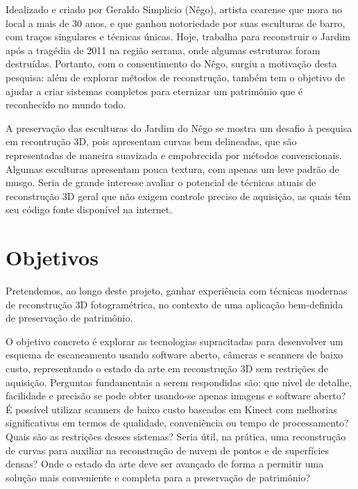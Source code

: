 Idealizado e criado por Geraldo Simplicio (Nêgo), artista cearense que mora no
local a mais de 30 anos, e que ganhou notoriedade por suas esculturas de barro,
com traços singulares e técnicas únicas. Hoje, trabalha para reconstruir o
Jardim após a tragédia de 2011 na região serrana, onde algumas estruturas foram
destruídas. Portanto, com o consentimento do Nêgo, surgiu a motivação desta
pesquisa: além de explorar métodos de reconstrução, também tem o objetivo de
ajudar a criar sistemas completos para eternizar um patrimônio que é reconhecido
no mundo todo.

A preservação das esculturas do Jardim do Nêgo se mostra um desafio à pesquisa em
recontrução 3D, pois apresentam curvas bem delineadas, que são 
representadas de maneira suavizada e empobrecida por métodos convencionais.
Algumas esculturas apresentam pouca textura, com apenas um leve padrão de musgo.
Seria de grande interesse avaliar o potencial de técnicas atuais de
reconstrução 3D geral que não exigem controle preciso de aquisição, as quais têm seu código fonte
disponível na internet.

\newpage

\section{Objetivos}\label{sec:objetivos}

Pretendemos, ao longo deste projeto, ganhar experiência com técnicas
modernas de reconstrução 3D fotogramétrica, no contexto de uma aplicação
bem-definida de preservação de patrimônio. 

O objetivo concreto é explorar as tecnologias supracitadas para
desenvolver um esquema de escaneamento usando software aberto, câmeras e
scanners de baixo custo, representando o estado da arte em reconstrução 3D sem
restrições de aquisição. Perguntas fundamentais a serem respondidas são: que
nível de detalhe, facilidade e precisão se pode obter usando-se apenas imagens e software
aberto? É possível utilizar scanners de baixo custo baseados em Kinect com
melhorias significativas em termos de qualidade, conveniência ou tempo de
processamento?  Quais são as restrições desses sistemas? Seria útil, na prática,
uma reconstrução de curvas para auxiliar na reconstrução de nuvem de pontos e de
superfícies densas? Onde o estado da arte deve ser avançado de forma a permitir
uma solução mais conveniente e completa para a preservação de patrimônio?


